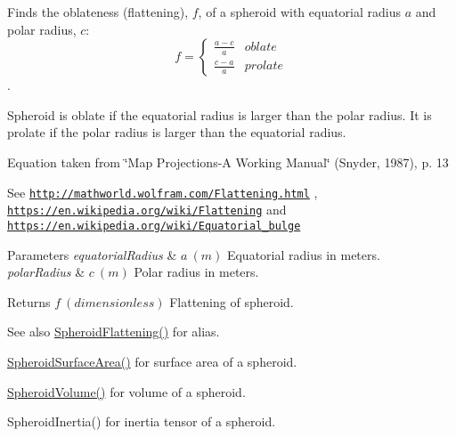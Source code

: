 Finds the oblateness (flattening), $f$, of a spheroid with equatorial radius $a$ and polar radius, $c$\+: \[ f =\begin{cases} \frac{a-c}{a}{} & oblate \\ \frac{c-a}{a} & prolate \end{cases} \]. 

Spheroid is oblate if the equatorial radius is larger than the polar radius. It is prolate if the polar radius is larger than the equatorial radius.

Equation taken from \char`\"{}\+Map Projections-\/\+A Working Manual\char`\"{} (Snyder, 1987), p. 13

See \href{http://mathworld.wolfram.com/Flattening.html}{\tt http\+://mathworld.\+wolfram.\+com/\+Flattening.\+html} , \href{https://en.wikipedia.org/wiki/Flattening}{\tt https\+://en.\+wikipedia.\+org/wiki/\+Flattening} and \href{https://en.wikipedia.org/wiki/Equatorial_bulge}{\tt https\+://en.\+wikipedia.\+org/wiki/\+Equatorial\+\_\+bulge} 
\begin{DoxyParams}{Parameters}
{\em equatorial\+Radius} & $ a\ (m)$ Equatorial radius in meters. \\
\hline
{\em polar\+Radius} & $ c\ (m)$ Polar radius in meters. \\
\hline
\end{DoxyParams}
\begin{DoxyReturn}{Returns}
$ f\ (dimensionless)$ Flattening of spheroid. 
\end{DoxyReturn}
\begin{DoxySeeAlso}{See also}
\mbox{\hyperlink{group___e_g_x_math-_geometry-3_d-_spheroid-_flattening_ga9822b6e1025edbf7d272949547c53511}{Spheroid\+Flattening()}} for alias. 

\mbox{\hyperlink{group___e_g_x_math-_geometry-3_d-_spheroid-_surface_area_ga32a21d075102ea9a235a43165675627e}{Spheroid\+Surface\+Area()}} for surface area of a spheroid. 

\mbox{\hyperlink{group___e_g_x_math-_geometry-3_d-_spheroid-_volume_gac89ed1e10e56c724b341591ecc5605dc}{Spheroid\+Volume()}} for volume of a spheroid. 

Spheroid\+Inertia() for inertia tensor of a spheroid. 
\end{DoxySeeAlso}
\mbox{\label{group___e_g_x_math-_geometry-3_d-_spheroid-_flattening_ga486adfc58b047197daf87f50b2039ca7}} 
